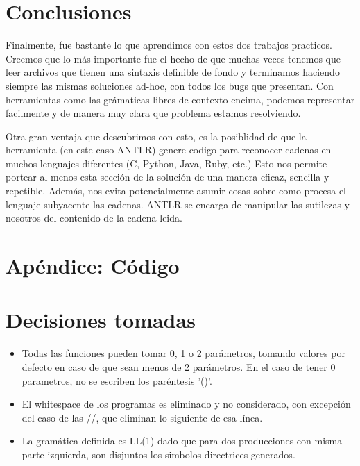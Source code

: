 \documentclass[a4paper]{article}
\begin{document}
\section{Conclusiones}
Finalmente, fue bastante lo que aprendimos con estos dos trabajos practicos.
Creemos que lo m\'as importante fue el hecho de que muchas veces tenemos que
leer archivos que tienen una sintaxis definible de fondo y terminamos haciendo
siempre las mismas soluciones ad-hoc, con todos los bugs que presentan. Con
herramientas como las gr\'amaticas libres de contexto encima, podemos representar
facilmente y de manera muy clara que problema estamos resolviendo.

Otra gran ventaja que descubrimos con esto, es la posiblidad de que la herramienta
(en este caso ANTLR) genere codigo para reconocer cadenas en muchos lenguajes
diferentes (C, Python, Java, Ruby, etc.) Esto nos permite portear al menos 
esta secci\'on de la soluci\'on de una manera eficaz, sencilla y repetible. 
Adem\'as, nos evita potencialmente asumir cosas sobre como procesa el lenguaje
subyacente las cadenas. ANTLR se encarga de manipular las sutilezas y nosotros
del contenido de la cadena leida.


\section{Ap\'endice: C\'odigo}



\section{Decisiones tomadas}
\begin{itemize}
\item Todas las funciones  pueden tomar 0, 1 o 2 parámetros, tomando valores por defecto en caso de que sean menos de 2 parámetros. En el caso de tener 0 parametros, no se escriben los paréntesis '()'.

\item El whitespace de los programas es eliminado y no considerado, con excepción del caso de las //, que eliminan lo siguiente de esa línea.

\item La gramática definida es LL(1) dado que para dos producciones con misma parte izquierda, son disjuntos los simbolos directrices generados.
\end{itemize}
\end{document}
